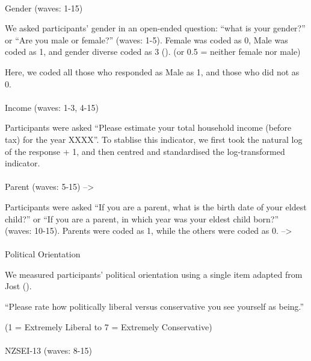 \documentclass[
  singlecolumn]{article}
\makeatletter
\let\oldparagraph\paragraph
\renewcommand{\paragraph}{
    \@ifstar
      \xxxParagraphStar
      \xxxParagraphNoStar
  }
\newcommand{\xxxParagraphStar}[1]{\oldparagraph*{#1}\mbox{}}
\newcommand{\xxxParagraphNoStar}[1]{\oldparagraph{#1}\mbox{}}
\makeatother
\begin{document}
\paragraph{Gender (waves: 1-15)}\label{gender-waves-1-15}

We asked participants' gender in an open-ended question: ``what is your
gender?'' or ``Are you male or female?'' (waves: 1-5). Female was coded
as 0, Male was coded as 1, and gender diverse coded as 3
(). (or 0.5
= neither female nor male)

Here, we coded all those who responded as Male as 1, and those who did
not as 0.

\paragraph{Income (waves: 1-3, 4-15)}\label{income-waves-1-3-4-15}

Participants were asked ``Please estimate your total household income
(before tax) for the year XXXX''. To stablise this indicator, we first
took the natural log of the response + 1, and then centred and
standardised the log-transformed indicator.

\paragraph{Parent (waves: 5-15)
--\textgreater{}}\label{parent-waves-5-15}

Participants were asked ``If you are a parent, what is the birth date of
your eldest child?'' or ``If you are a parent, in which year was your
eldest child born?'' (waves: 10-15). Parents were coded as 1, while the
others were coded as 0. --\textgreater{}

\paragraph{Political Orientation}\label{political-orientation}

We measured participants' political orientation using a single item
adapted from Jost ().

``Please rate how politically liberal versus conservative you see
yourself as being.''

(1 = Extremely Liberal to 7 = Extremely Conservative)

\paragraph{NZSEI-13 (waves: 8-15)}\label{nzsei-13-waves-8-15}
\end{document}
